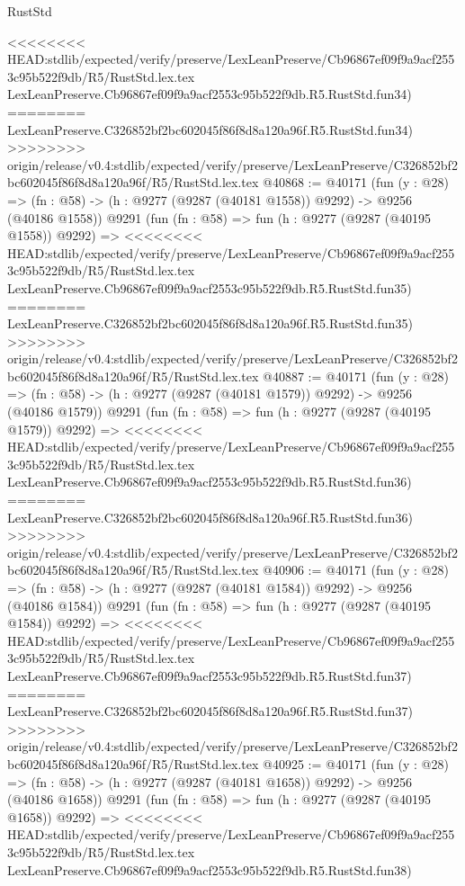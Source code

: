 \begin{lexlean}{RustStd}
\begin{coremodule}
{\begin{coremodule}
{{{{{{{{{{{{{{{{{{{{{{{{{{{{{{{{{{{{{{{{{{{{{{{{{{{{{{{<<<<<<<< HEAD:stdlib/expected/verify/preserve/LexLeanPreserve/Cb96867ef09f9a9acf2553c95b522f9db/R5/RustStd.lex.tex
    LexLeanPreserve.Cb96867ef09f9a9acf2553c95b522f9db.R5.RustStd.fun34)
========
    LexLeanPreserve.C326852bf2bc602045f86f8d8a120a96f.R5.RustStd.fun34)
>>>>>>>> origin/release/v0.4:stdlib/expected/verify/preserve/LexLeanPreserve/C326852bf2bc602045f86f8d8a120a96f/R5/RustStd.lex.tex
@40868 := @40171
    (fun (y : @28) =>
    (fn : @58) -> (h : @9277 (@9287 (@40181 @1558)) @9292) -> @9256 (@40186 @1558))
    @9291
    (fun (fn : @58) =>
    fun (h : @9277 (@9287 (@40195 @1558)) @9292) =>
<<<<<<<< HEAD:stdlib/expected/verify/preserve/LexLeanPreserve/Cb96867ef09f9a9acf2553c95b522f9db/R5/RustStd.lex.tex
    LexLeanPreserve.Cb96867ef09f9a9acf2553c95b522f9db.R5.RustStd.fun35)
========
    LexLeanPreserve.C326852bf2bc602045f86f8d8a120a96f.R5.RustStd.fun35)
>>>>>>>> origin/release/v0.4:stdlib/expected/verify/preserve/LexLeanPreserve/C326852bf2bc602045f86f8d8a120a96f/R5/RustStd.lex.tex
@40887 := @40171
    (fun (y : @28) =>
    (fn : @58) -> (h : @9277 (@9287 (@40181 @1579)) @9292) -> @9256 (@40186 @1579))
    @9291
    (fun (fn : @58) =>
    fun (h : @9277 (@9287 (@40195 @1579)) @9292) =>
<<<<<<<< HEAD:stdlib/expected/verify/preserve/LexLeanPreserve/Cb96867ef09f9a9acf2553c95b522f9db/R5/RustStd.lex.tex
    LexLeanPreserve.Cb96867ef09f9a9acf2553c95b522f9db.R5.RustStd.fun36)
========
    LexLeanPreserve.C326852bf2bc602045f86f8d8a120a96f.R5.RustStd.fun36)
>>>>>>>> origin/release/v0.4:stdlib/expected/verify/preserve/LexLeanPreserve/C326852bf2bc602045f86f8d8a120a96f/R5/RustStd.lex.tex
@40906 := @40171
    (fun (y : @28) =>
    (fn : @58) -> (h : @9277 (@9287 (@40181 @1584)) @9292) -> @9256 (@40186 @1584))
    @9291
    (fun (fn : @58) =>
    fun (h : @9277 (@9287 (@40195 @1584)) @9292) =>
<<<<<<<< HEAD:stdlib/expected/verify/preserve/LexLeanPreserve/Cb96867ef09f9a9acf2553c95b522f9db/R5/RustStd.lex.tex
    LexLeanPreserve.Cb96867ef09f9a9acf2553c95b522f9db.R5.RustStd.fun37)
========
    LexLeanPreserve.C326852bf2bc602045f86f8d8a120a96f.R5.RustStd.fun37)
>>>>>>>> origin/release/v0.4:stdlib/expected/verify/preserve/LexLeanPreserve/C326852bf2bc602045f86f8d8a120a96f/R5/RustStd.lex.tex
@40925 := @40171
    (fun (y : @28) =>
    (fn : @58) -> (h : @9277 (@9287 (@40181 @1658)) @9292) -> @9256 (@40186 @1658))
    @9291
    (fun (fn : @58) =>
    fun (h : @9277 (@9287 (@40195 @1658)) @9292) =>
<<<<<<<< HEAD:stdlib/expected/verify/preserve/LexLeanPreserve/Cb96867ef09f9a9acf2553c95b522f9db/R5/RustStd.lex.tex
    LexLeanPreserve.Cb96867ef09f9a9acf2553c95b522f9db.R5.RustStd.fun38)
}}}}}}}}}}}}}}}}}}}}}}}}}}}}}}}}}}}}}}}}}}}}}}}}}}}}}}}
\end{coremodule}}
\end{coremodule}
\end{lexlean}
